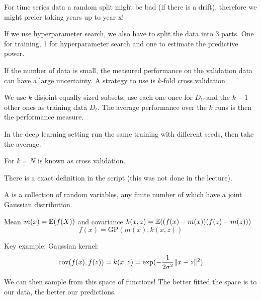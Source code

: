 \begin{aremark}
    For time series data a random split might be bad (if there is a drift), therefore we might prefer taking years up to year x!
\end{aremark}

\begin{aremark}
    If we use hyperparameter search, we also have to split the data into 3 parts. One for training, 1 for hyperparameter search and one to estimate the predictive power.
\end{aremark}

If the number of data is small, the measured performance on the validation data can have a large uncertainty. A 
strategy to use is $k$-fold cross validation.

We use $k$ disjoint equally sized subsets, use each one once for $D_V$ and the $k-1$ other ones as 
training data $D_t$. The average performance over the $k$ runs is then the performance measure.

\begin{aremark}
    In the deep learning setting run the same training with different seeds, then take the average.
\end{aremark}

For $k=N$ is known as  cross validation.


\begin{definition}\label{def:52}
    There is a exact definition in the script (this was not done in the lecture).
\end{definition}

\begin{definition}\label{def:53}
    A  is a collection of random variables,
    any finite number of which have a joint Gaussian distribution.

    Mean $m(x)=\mathbb{E}(f(X))$ and covariance $k(x,z)=\mathbb{E}((f(x)-m(x))(f(z)-m(z)))$
    \[f(x)=\text{GP}(m(x),k(x,z))\]
\end{definition}

Key example: Gaussian kernel:
\[\text{cov}(f(x),f(z))=k(x,z)=\exp(-\frac{1}{2\sigma^2}\Vert x-z\Vert^2)\]

\begin{aremark}
    We can then sample from this space of functions! The better fitted the space is to our data, the better our predictions.
\end{aremark}


